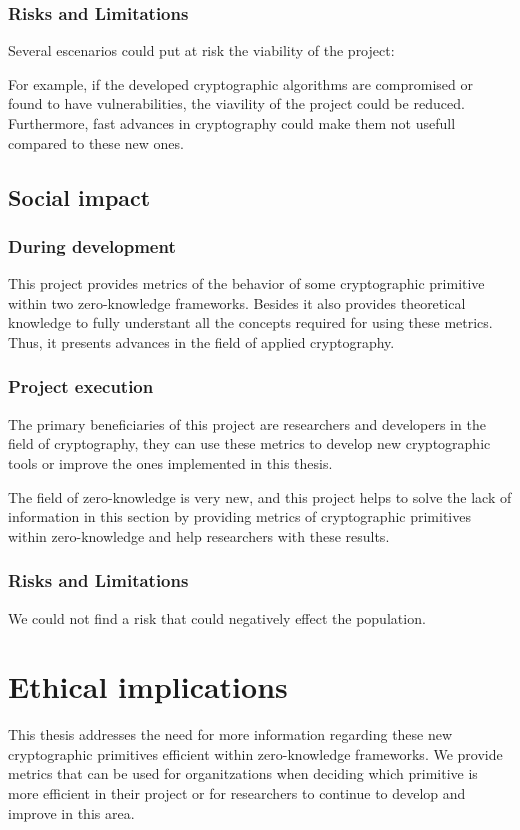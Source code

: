 \subsubsection*{Risks and Limitations}
Several escenarios could put at risk the viability of the project:

For example, if the developed cryptographic algorithms are compromised or found to have vulnerabilities, the viavility of the project could be reduced. Furthermore, fast advances in cryptography could make them not usefull compared to these new ones.

\subsection*{Social impact}
\subsubsection*{During development}
This project provides metrics of the behavior of some cryptographic primitive within two zero-knowledge frameworks. Besides it also provides theoretical knowledge to fully understant all the concepts required for using these metrics. Thus, it presents advances in the field of applied cryptography.

\subsubsection*{Project execution}
The primary beneficiaries of this project are researchers and developers in the field of cryptography, they can use these metrics to develop new cryptographic tools or improve the ones implemented in this thesis.

The field of zero-knowledge is very new, and this project helps to solve the lack of information in this section by providing metrics of cryptographic primitives within zero-knowledge and help researchers with these results.

\subsubsection*{Risks and Limitations}
We could not find a risk that could negatively effect the population.

\section*{Ethical implications}
This thesis addresses the need for more information regarding these new cryptographic primitives efficient within zero-knowledge frameworks. We provide metrics that can be used for organitzations when deciding which primitive is more efficient in their project or for researchers to continue to develop and improve in this area.


